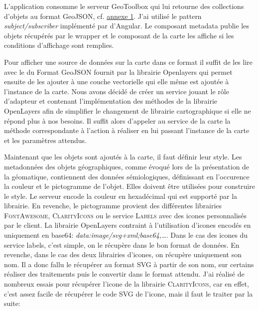 \documentclass{rapportUHA40}
\begin{document}

L'application consomme le serveur GeoToolbox qui lui retourne des collections
d'objets au format GeoJSON, cf. \hyperlink{ANNEX1}{annexe 1}. J'ai utilisé le
pattern \textit{subject/subscriber} implémenté par d'Angular. Le composant
metadata publie les objets récupérés par le wrapper et le composant de la carte
les affiche si les conditions d'affichage sont remplies.

Pour afficher une source de données sur la carte dans ce format il suffit de
les lire avec le  \fg{} du Format GeoJSON fournit par la librairie
Openlayers qui permet ensuite de les ajouter à une couche vectorielle qui elle
même est ajoutée à l'instance de la carte. Nous avons décidé de créer un
service jouant le rôle d'adapteur et contenant l'implémentation des méthodes de
la librairie OpenLayers afin de simplifier le changement de librairie
cartographique si elle ne répond plus à nos besoins. Il suffit alors d'appeler
au service de la carte la méthode correspondante à l'action à réaliser en lui
passant l'instance de la carte et les paramètres attendus.

Maintenant que les objets sont ajoutés à la carte, il faut définir leur style.
Les metadonnées des objets géographiques, comme évoqué lors de la présentation
de la géomatique, contiennent des données sémiologiques, définissant en
l'occurence la couleur et le pictogramme de l'objet. Elles doivent être
utilisées pour construire le style. Le serveur encode la couleur en hexadécimal
qui est supporté par la librairie. En revenche, le pictogramme provient des
différentes librairies \textsc{FontAwesome}, \textsc{ClarityIcons} ou le
service \textsc{Labels} avec des icones personnalisés par le client. La
librairie OpenLayers contraint à l'utilisation d'icones encodés en uniquement
en base64: \textit{data:image/svg+xml;base64,\ldots}. Dans le cas des icones du
service labels, c'est simple, on le récupère dans le bon format de données. En
revenche, dans le cas des deux librairies d'icones, on récupère uniquement son
nom. Il a donc fallu le récupérer au format SVG à partir de son nom, sur
certains réaliser des traitements puis le convertir dans le format attendu.
J'ai réalisé de nombreux essais pour récupérer l'icone de la librairie
\textsc{ClarityIcons}, car en effet, c'est assez facile de récupérer le code
SVG de l'icone, mais il faut le traiter par la suite:
\end{document}
